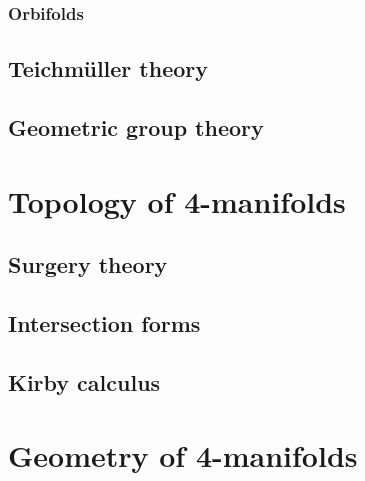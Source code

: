\documentclass{../note}
\begin{document}
\begin{prb}
\end{prb}


\section{Orbifolds}




\chapter{Teichm\"uller theory}
\section{}

\chapter{Geometric group theory}
\section{}


\part{Topology of 4-manifolds}
\chapter{Surgery theory}
\chapter{Intersection forms}
\chapter{Kirby calculus}


\part{Geometry of 4-manifolds}
\chapter{}
\chapter{}
\chapter{}
\end{document}
